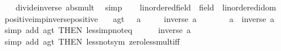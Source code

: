 \begin{isabellebody}
%
\isadelimproof
\ \ %
\endisadelimproof
%
\isatagproof
{}\isamarkupfalse%
\ divide{\isacharunderscore}{\kern0pt}inverse\ abs{\isacharunderscore}{\kern0pt}mult\ \isamarkupfalse%
\ simp%
\endisatagproof
{\isafoldproof}%
%
\isadelimproof
\isanewline
%
\endisadelimproof
\ \ \isanewline
{}\isamarkupfalse%
\isanewline
\isanewline
{}\isamarkupfalse%
\ linordered{\isacharunderscore}{\kern0pt}field\ {\isacharequal}{\kern0pt}\ field\ {\isacharplus}{\kern0pt}\ linordered{\isacharunderscore}{\kern0pt}idom\isanewline
{}\isanewline
\isanewline
{}\isamarkupfalse%
\ positive{\isacharunderscore}{\kern0pt}imp{\isacharunderscore}{\kern0pt}inverse{\isacharunderscore}{\kern0pt}positive{\isacharcolon}{\kern0pt}\isanewline
\ \ \ a{\isacharunderscore}{\kern0pt}gt{\isacharunderscore}{\kern0pt}{}{\isacharcolon}{\kern0pt}\ {\isachardoublequoteopen}{}\ {\isacharless}{\kern0pt}\ a{\isachardoublequoteclose}\isanewline
\ \ \ {\isachardoublequoteopen}{}\ {\isacharless}{\kern0pt}\ inverse\ a{\isachardoublequoteclose}\isanewline
%
\isadelimproof
%
\endisadelimproof
%
\isatagproof
{}\isamarkupfalse%
\ {\isacharminus}{\kern0pt}\isanewline
\ \ \isamarkupfalse%
\ {\isachardoublequoteopen}{}\ {\isacharless}{\kern0pt}\ a\ {\isacharasterisk}{\kern0pt}\ inverse\ a{\isachardoublequoteclose}\isanewline
\ \ \ \ \isamarkupfalse%
\ {\isacharparenleft}{\kern0pt}simp\ add{\isacharcolon}{\kern0pt}\ a{\isacharunderscore}{\kern0pt}gt{\isacharunderscore}{\kern0pt}{}\ {\isacharbrackleft}{\kern0pt}THEN\ less{\isacharunderscore}{\kern0pt}imp{\isacharunderscore}{\kern0pt}not{\isacharunderscore}{\kern0pt}eq{}{\isacharbrackright}{\kern0pt}{\isacharparenright}{\kern0pt}\isanewline
\ \ \isamarkupfalse%
\ {\isachardoublequoteopen}{}\ {\isacharless}{\kern0pt}\ inverse\ a{\isachardoublequoteclose}\isanewline
\ \ \ \ \isamarkupfalse%
\ {\isacharparenleft}{\kern0pt}simp\ add{\isacharcolon}{\kern0pt}\ a{\isacharunderscore}{\kern0pt}gt{\isacharunderscore}{\kern0pt}{}\ {\isacharbrackleft}{\kern0pt}THEN\ less{\isacharunderscore}{\kern0pt}not{\isacharunderscore}{\kern0pt}sym{\isacharbrackright}{\kern0pt}\ zero{\isacharunderscore}{\kern0pt}less{\isacharunderscore}{\kern0pt}mult{\isacharunderscore}{\kern0pt}iff{\isacharparenright}{\kern0pt}\isanewline
{}\isamarkupfalse%
%
\endisatagproof
{\isafoldproof}%
%

\end{isabellebody}

